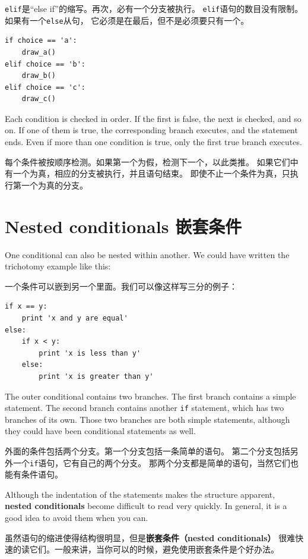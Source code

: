 \documentclass[10pt]{book}
\begin{document}
\begin{CJK}{UTF8}{gbsn}
{\tt elif}是``else if''的缩写。再次，必有一个分支被执行。 
{\tt elif}语句的数目没有限制。如果有一个{\tt else}从句，
它必须是在最后，但不是必须要只有一个。

\begin{verbatim}
if choice == 'a':
    draw_a()
elif choice == 'b':
    draw_b()
elif choice == 'c':
    draw_c()
\end{verbatim}
%
Each condition is checked in order.  If the first is false,
the next is checked, and so on.  If one of them is
true, the corresponding branch executes, and the statement
ends.  Even if more than one condition is true, only the
first true branch executes.  

每个条件被按顺序检测。如果第一个为假，检测下一个，以此类推。
如果它们中有一个为真，相应的分支被执行，并且语句结束。
即使不止一个条件为真，只执行第一个为真的分支。

\section{Nested conditionals 嵌套条件}

One conditional can also be nested within another.  We could have
written the trichotomy example like this:

一个条件可以嵌到另一个里面。我们可以像这样写三分的例子：

\begin{verbatim}
if x == y:
    print 'x and y are equal'
else:
    if x < y:
        print 'x is less than y'
    else:
        print 'x is greater than y'
\end{verbatim}
%
The outer conditional contains two branches.  The
first branch contains a simple statement.  The second branch
contains another {\tt if} statement, which has two branches of its
own.  Those two branches are both simple statements,
although they could have been conditional statements as well.

外面的条件包括两个分支。第一个分支包括一条简单的语句。
第二个分支包括另外一个{\tt if}语句，它有自己的两个分支。
那两个分支都是简单的语句，当然它们也能有条件语句。

Although the indentation of the statements makes the structure
apparent, {\bf nested conditionals} become difficult to read very
quickly. In general, it is a good idea to avoid them when you can.

虽然语句的缩进使得结构很明显，但是{\bf 嵌套条件（nested conditionals）}
很难快速的读它们。一般来讲，当你可以的时候，避免使用嵌套条件是个好办法。


\end{CJK}
\end{document}
